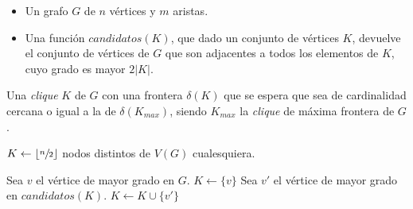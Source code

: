 \begin{pseudocodigo}
    \Require\Statex
        \begin{itemize}
            \item Un grafo $G$ de $n$ v\'ertices y $m$ aristas.

            \item Una funci\'on $candidatos(K)$, que dado un conjunto de v\'ertices
                $K$, devuelve el conjunto de v\'ertices de $G$ que son adjacentes
                a todos los elementos de $K$, cuyo grado es mayor $2|K|$.
        \end{itemize}

    \Statex

    \Ensure Una \emph{clique} $K$ de $G$ con una frontera $\delta(K)$ que se
        espera que sea de cardinalidad cercana o igual a la de $\delta(K_{max})$,
        siendo $K_{max}$ la \emph{clique} de m\'axima frontera de $G$.

    \Statex

        \State $K \gets \lfloor\sfrac{n}{2}\rfloor$ nodos distintos de $V(G)$ cualesquiera.
        \Statex

    \Else
        \State Sea $v$ el v\'ertice de mayor grado en $G$.
        \State $K \gets \{v\}$
            \State Sea $v'$ el v\'ertice de mayor grado en $candidatos(K)$.
            \State $K \gets K \cup \{v'\}$
        \EndWhile
    \EndIf

    \State {}
\end{pseudocodigo}
